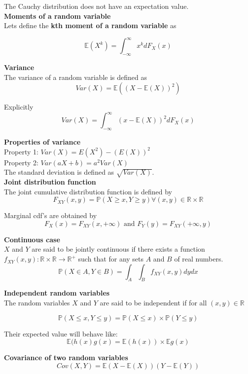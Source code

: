 The Cauchy distribution does not have an expectation value.\\

\textbf{Moments of a random variable}\\

Lets define the \textbf{kth moment of a random variable} as

$$\mathbb{E}(X^k) = \int_{-\infty}^{\infty} x^k dF_X(x)$$

\textbf{Variance}\\
The variance of a random variable is defined as
$$Var(X) = \mathbb{E}((X-\mathbb{E}(X))^2)$$

Explicitly
$$Var(X) = \int_{-\infty}^{\infty} (x- \mathbb{E}(X))^2 dF_X(x)$$

\textbf{Properties of variance} \\
Property 1: $Var(X) = E(X^2) - (E(X))^2$\\
Property 2: $Var(aX + b) = a^2 Var(X)$ \\

The standard deviation is defined as $\sqrt{Var(X)}$.\\

\textbf{Joint distribution function}\\

The joint cumulative distribution function is defined by
$$F_{XY}(x,y) = \mathbb{P}(X \geq x, Y \geq y) \forall (x,y) \in \mathbb{R} \times \mathbb{R}$$

Marginal cdf's are obtained by 
$$F_X(x) = F_{XY}(x,+\infty) \text{ and } F_Y(y) = F_{XY}(+\infty, y)$$

\textbf{Continuous case}\\
$X$ and $Y$ are said to be jointly continuous if there exists a function $f_{XY}(x,y): \mathbb{R} \times \mathbb{R} \rightarrow \mathbb{R}^+$ such that for any sets $A$ and $B$ of real numbers.
$$\mathbb{P}(X \in A, Y \in B) = \int_A \int_B f_{XY}(x,y) dy dx$$

\textbf{Independent random variables}\\
The random variables $X$ and $Y$ are said to be independent if for all $(x,y) \in \mathbb{R}$ 

$$\mathbb{P}(X \leq x, Y \leq y) = \mathbb{P}(X \leq x) \times \mathbb{P}(Y \leq y)$$

Their expected value will behave like:
$$\mathbb{E}(h(x)g(x) = \mathbb{E}(h(x)) \times \mathbb{E}{g(x)}$$

\textbf{Covariance of two random variables}
$$Cov(X,Y) = \mathbb{E}(X - \mathbb{E}(X))(Y - \mathbb{E}(Y))$$

